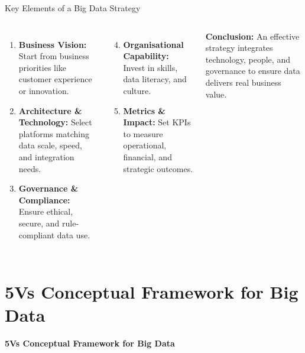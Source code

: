 \documentclass[aspectratio=169, table]{beamer}
\begin{document}
	\begin{frame}[fragile]{Key Elements of a Big Data Strategy}
		\vspace{20pt}
		\small
		\begin{columns}[T]
			\begin{enumerate}
				\item \textbf{Business Vision:}  
				Start from business priorities like customer experience or innovation.
				
				\item \textbf{Architecture \& Technology:}  
				Select platforms matching data scale, speed, and integration needs.
				
				\item \textbf{Governance \& Compliance:}  
				Ensure ethical, secure, and rule-compliant data use.
			\end{enumerate}
			
			\begin{enumerate}
				\setcounter{enumi}{3}
				\item \textbf{Organisational Capability:}  
				Invest in skills, data literacy, and culture.
				
				\item \textbf{Metrics \& Impact:}  
				Set KPIs to measure operational, financial, and strategic outcomes.
			\end{enumerate}
			
			\vspace{6pt}
			\textbf{Conclusion:}  
			An effective strategy integrates technology, people, and governance to ensure data delivers real business value.
		\end{columns}
	\end{frame}
	
	
	\section{5Vs Conceptual Framework for Big Data}
	
	\begin{frame}{\hfill}
		\centering
		\Huge{\textbf{5Vs Conceptual Framework for Big Data}}
	\end{frame}
	
\end{document}
